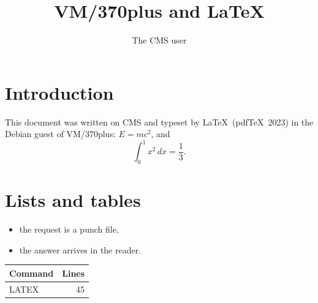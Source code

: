 \documentclass[a4paper]{article}
\title{VM/370plus and \LaTeX}
\author{The CMS user}
\begin{document}
\maketitle
\tableofcontents
\section{Introduction}
This document was written on CMS and typeset by \LaTeX\ (pdf\TeX\ 2023)
in the Debian guest of VM/370plus: $E = mc^2$, and
\begin{equation} \int_0^1 x^2\,dx = \frac13 . \end{equation}
\section{Lists and tables}
\begin{itemize}\item the request is a punch file,
\item the answer arrives in the reader.\end{itemize}
\begin{tabular}{|l|r|}\hline
Command & Lines\\ \hline
LATEX & 45\\ \hline
\end{tabular}
\end{document}
